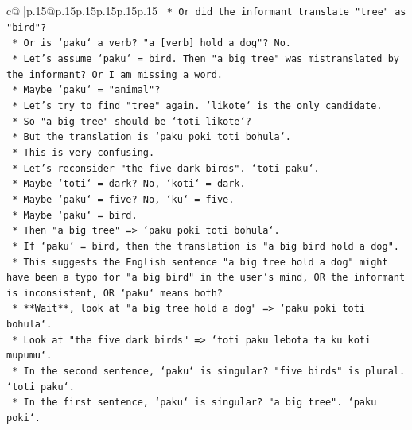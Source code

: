 \documentclass{article}
\begin{document}
{\begin{supertabular}{c@{$\;$}|p{.15\linewidth}@{}p{.15\linewidth}p{.15\linewidth}p{.15\linewidth}p{.15\linewidth}p{.15\linewidth}}
{{{\texttt{                        *   Or did the informant translate "tree" as "bird"?} \\
\texttt{                        *   Or is `paku` a verb? "a {[}verb{]} hold a dog"? No.} \\
\texttt{                        *   Let's assume `paku` = bird. Then "a big tree" was mistranslated by the informant? Or I am missing a word.} \\
\texttt{                        *   Maybe `paku` = "animal"?} \\
\texttt{                        *   Let's try to find "tree" again. `likote` is the only candidate.} \\
\texttt{                        *   So "a big tree" should be `toti likote`?} \\
\texttt{                        *   But the translation is `paku poki toti bohula`.} \\
\texttt{                        *   This is very confusing.} \\
\texttt{                        *   Let's reconsider "the five dark birds". `toti paku`.} \\
\texttt{                        *   Maybe `toti` = dark? No, `koti` = dark.} \\
\texttt{                        *   Maybe `paku` = five? No, `ku` = five.} \\
\texttt{                        *   Maybe `paku` = bird.} \\
\texttt{                        *   Then "a big tree" => `paku poki toti bohula`.} \\
\texttt{                        *   If `paku` = bird, then the translation is "a big bird hold a dog".} \\
\texttt{                        *   This suggests the English sentence "a big tree hold a dog" might have been a typo for "a big bird" in the user's mind, OR the informant is inconsistent, OR `paku` means both?} \\
\texttt{                        *   **Wait**, look at "a big tree hold a dog" => `paku poki toti bohula`.} \\
\texttt{                        *   Look at "the five dark birds" => `toti paku lebota ta ku koti mupumu`.} \\
\texttt{                        *   In the second sentence, `paku` is singular? "five birds" is plural. `toti paku`.} \\
\texttt{                        *   In the first sentence, `paku` is singular? "a big tree". `paku poki`.} \\
}}}
\end{supertabular}}
\end{document}
